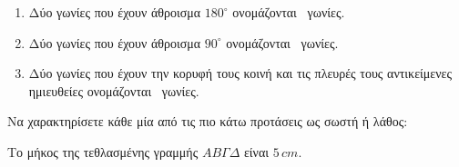 \documentclass[12pt,a4page]{article}
\def\blank{\lowerdots[0ex]{10}}
\begin{document}
\begin{exercise}
\begin{enumerate}[label=\arabic*.,leftmargin=14pt,itemsep=2ex]
  \item Δύο γωνίες που έχουν άθροισμα $180^\circ$ ονομάζονται \blank\ γωνίες.

  \item Δύο γωνίες που έχουν άθροισμα $90^\circ$ ονομάζονται \blank\ γωνίες.

  \item Δύο γωνίες που έχουν την κορυφή τους κοινή και τις πλευρές τους αντικείμενες ημιευθείες ονομάζονται \blank\ γωνίες.

  \end{enumerate}
\item Να χαρακτηρίσετε κάθε μία από τις πιο κάτω προτάσεις ως σωστή ή λάθος:

  \vspace{-1.5ex}

  \begin{truefalse}
  \item Το μήκος της τεθλασμένης γραμμής $AB\Gamma\Delta$ είναι $5\,cm$.\\


\end{truefalse}
\end{exercise}
\end{document}

